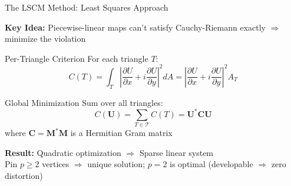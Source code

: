 \documentclass[aspectratio=169]{beamer}
\begin{document}
\begin{frame}{The LSCM Method: Least Squares Approach}

\textbf{Key Idea:} Piecewise-linear maps can't satisfy Cauchy-Riemann exactly $\Rightarrow$ minimize the violation

\vspace{0em}
\begin{block}{Per-Triangle Criterion}
For each triangle $T$:
\[
  C(T) = \int_T \left| \frac{\partial U}{\partial x} + i \frac{\partial U}{\partial y} \right|^2 dA
  = \left| \frac{\partial U}{\partial x} + i \frac{\partial U}{\partial y} \right|^2 A_T
\]
\end{block}

\vspace{0em}
\begin{block}{Global Minimization}
Sum over all triangles:
\[
  C(\mathbf{U}) = \sum_{T \in \mathcal{T}} C(T) = \mathbf{U}^* \mathbf{C} \mathbf{U}
\]
where $\mathbf{C} = \mathbf{M}^* \mathbf{M}$ is a Hermitian Gram matrix
\end{block}

\textbf{Result:} Quadratic optimization $\Rightarrow$ \alert{Sparse linear system}\\
Pin $p \ge 2$ vertices $\Rightarrow$ unique solution; \alert{$p = 2$ is optimal} (developable $\Rightarrow$ zero distortion)

\end{frame}
\end{document}
